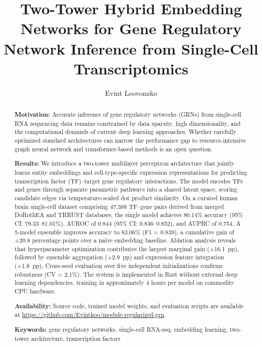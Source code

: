\documentclass[10pt,twocolumn]{article}
\title{\Large\bfseries Two-Tower Hybrid Embedding Networks for Gene Regulatory Network Inference from Single-Cell Transcriptomics}
\author{Evint Leovonzko}
\date{}
\begin{document}
\maketitle
\thispagestyle{empty}

\begin{abstract}
\noindent\textbf{Motivation:}
Accurate inference of gene regulatory networks (GRNs) from single-cell RNA sequencing data remains constrained by data sparsity, high dimensionality, and the computational demands of current deep learning approaches.
Whether carefully optimized standard architectures can narrow the performance gap to resource-intensive graph neural network and transformer-based methods is an open question.

\noindent\textbf{Results:}
We introduce a two-tower multilayer perceptron architecture that jointly learns entity embeddings and cell-type-specific expression representations for predicting transcription factor (TF)--target gene regulatory interactions.
The model encodes TFs and genes through separate parametric pathways into a shared latent space, scoring candidate edges via temperature-scaled dot product similarity.
On a curated human brain single-cell dataset comprising 47{,}388 TF--gene pairs derived from merged DoRothEA and TRRUST databases, the single model achieves 80.14\% accuracy (95\% CI: 79.33--81.01\%), AUROC of 0.844 (95\% CI: 0.836--0.852), and AUPRC of 0.754.
A 5-model ensemble improves accuracy to 83.06\% (F1 = 0.839), a cumulative gain of +20.8 percentage points over a na\"{i}ve embedding baseline.
Ablation analysis reveals that hyperparameter optimization contributes the largest marginal gain (+16.1~pp), followed by ensemble aggregation (+2.9~pp) and expression feature integration (+1.8~pp).
Cross-seed evaluation over five independent initializations confirms robustness (CV = 2.1\%).
The system is implemented in Rust without external deep learning dependencies, training in approximately 4 hours per model on commodity CPU hardware.

\noindent\textbf{Availability:}
Source code, trained model weights, and evaluation scripts are available at \url{https://github.com/Evintkoo/module-regularized-grn}.

\noindent\textbf{Keywords:} gene regulatory networks, single-cell RNA-seq, embedding learning, two-tower architecture, transcription factors
\end{abstract}
\end{document}
